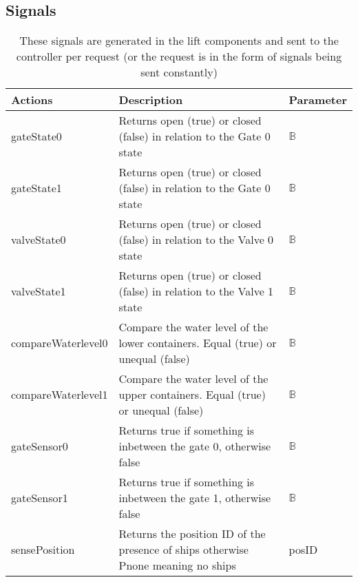 		
		


		
		\subsection{Signals}
		\begin{table}[htbp]
			\centering
			\caption{These signals are generated in the lift components and sent to the controller per request (or the request is in the form of signals being sent constantly)}
			\begin{tabular}{lp{6cm}l}
				\toprule
				\textbf{Actions} & \textbf{Description} & \textbf{Parameter} \\
				\hline
				gateState0 & Returns open (true) or closed (false) in relation to the Gate 0 state &  $ \mathbb{B} $ \\
				gateState1 & Returns open (true) or closed (false) in relation to the Gate 0 state &  $ \mathbb{B} $ \\
				valveState0 & Returns open (true) or closed (false) in relation to the Valve 0 state &  $ \mathbb{B} $ \\
				valveState1 & Returns open (true) or closed (false) in relation to the Valve 1 state &  $ \mathbb{B} $ \\
				compareWaterlevel0 & Compare the water level of the lower containers. Equal (true) or unequal (false) &  $ \mathbb{B} $ \\
				compareWaterlevel1 & Compare the water level of the upper containers. Equal (true) or unequal (false) &  $ \mathbb{B} $ \\
				gateSensor0 &  Returns true if something is inbetween the gate 0, otherwise false &  $ \mathbb{B} $ \\
				gateSensor1 &  Returns true if something is inbetween the gate 1, otherwise false &  $ \mathbb{B} $ \\
				sensePosition  & Returns the position ID of the presence of ships otherwise Pnone meaning no ships & posID \\
				\bottomrule
			\end{tabular}%
				\label{tab:addlabel}%
				\end{table}%
	
			
			
